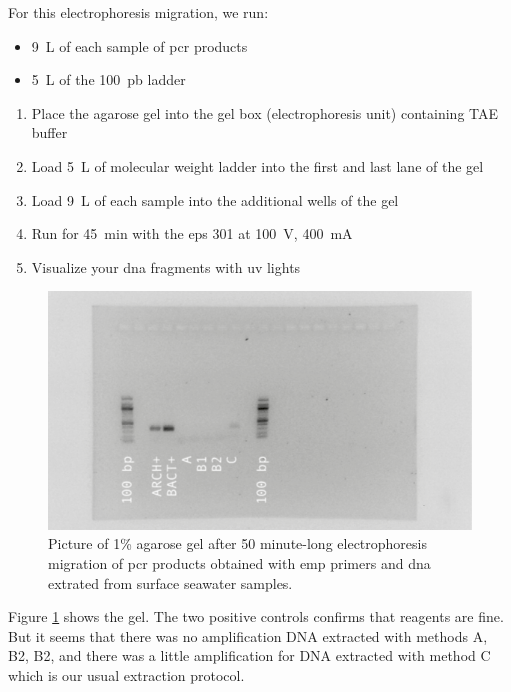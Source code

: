 For this electrophoresis migration, we run:
\begin{itemize}
\item 9~\textmu L of each sample of \gls{pcr} products
\item 5~\textmu L of the 100~pb ladder
\end{itemize}

\begin{enumerate}
\item Place the agarose gel into the gel box (electrophoresis unit) containing TAE buffer
\item Load 5~\textmu L of molecular weight ladder into the first and last lane of the gel
\item Load 9~\textmu L of each sample into the additional wells of the gel
\item Run for 45~min with the \gls{eps} 301 at 100~V, 400~mA
\item Visualize your \gls{dna} fragments with \gls{uv} lights
\end{enumerate}

\begin{figure}[H] %
    \centering
    \caption{Picture of 1\% agarose gel after 50 minute-long electrophoresis migration of \gls{pcr} products obtained with \gls{emp} primers and \gls{dna} extrated from surface seawater samples.}
    \label{fig:20180130_EMP_OneTaq}
    \includegraphics[width=\textwidth]{graphics/pic/20180130_EMP_OneTaq.png}
\end{figure}

Figure \ref{fig:20180130_EMP_OneTaq} shows the gel. The two positive controls confirms that reagents are fine. But it seems that there was no amplification DNA extracted with methods A, B2, B2, and there was a little amplification for DNA extracted with method C which is our usual extraction protocol. 

